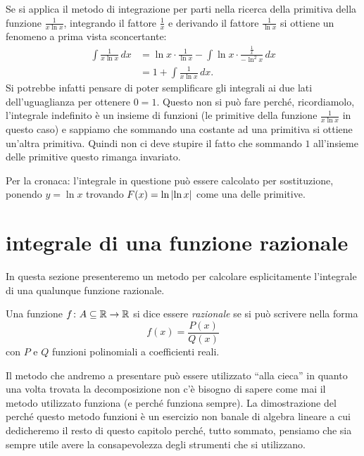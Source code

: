 \begin{remark}
Se si applica il metodo di integrazione per parti nella ricerca della primitiva
della funzione $\frac{1}{x\ln x}$, integrando il fattore $\frac 1 x$ e
derivando il fattore $\frac 1 {\ln x}$ si ottiene un fenomeno a prima vista
sconcertante:
\begin{align*}
  \int \frac{1}{x\ln x}\,dx
  &= \ln x \cdot \frac{1}{\ln x} - \int \ln x \cdot \frac{\frac 1 x}{-\ln^2 x}\, dx\\
  &= 1 + \int \frac{1}{x\ln x}\, dx.
\end{align*}
Si potrebbe infatti pensare di poter semplificare gli integrali ai due lati
dell'uguaglianza per ottenere $0=1$.
Questo non si può fare perché, ricordiamolo, l'integrale indefinito è un insieme
di funzioni (le primitive della funzione $\frac{1}{x\ln x}$ in questo caso)
e sappiamo che sommando una costante ad una primitiva si ottiene un'altra primitiva.
Quindi non ci deve stupire il fatto che sommando $1$ all'insieme delle primitive
questo rimanga invariato.

Per la cronaca: l'integrale in questione può essere calcolato per sostituzione,
ponendo $y=\ln x$ trovando $F(x) = \ln{\left|\ln x\right|}$ come una delle primitive.
\end{remark}

%
%
%
\section{integrale di una funzione razionale}
%
In questa sezione presenteremo un metodo per
calcolare esplicitamente l'integrale di una qualunque funzione razionale.

\begin{definition}
Una funzione $f\colon A \subseteq \mathbb R \to \mathbb R$
si dice essere \emph{razionale} se si può scrivere nella forma
\[
  f(x) = \frac{P(x)}{Q(x)}
\]
con $P$ e $Q$ funzioni polinomiali a coefficienti reali.
\end{definition}

Il metodo che andremo a presentare può essere utilizzato ``alla cieca'' in
quanto una volta trovata la decomposizione non c'è bisogno di sapere
come mai il metodo utilizzato funziona (e perché funziona sempre).
La dimostrazione del perché questo metodo funzioni è un esercizio non
banale di algebra lineare a cui dedicheremo il resto di questo capitolo
perché, tutto sommato, pensiamo che sia sempre utile avere la consapevolezza degli strumenti che si utilizzano.

